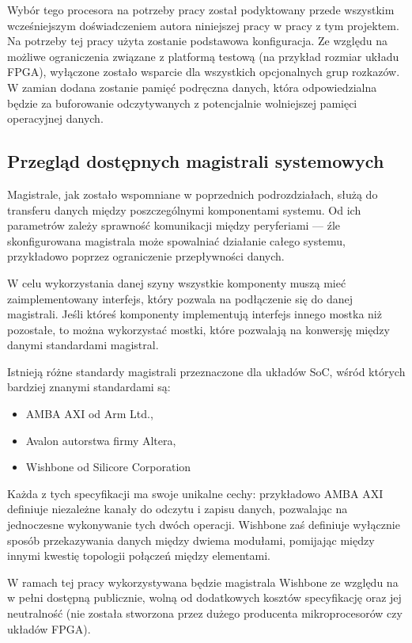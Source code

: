 Wybór tego procesora na potrzeby pracy został podyktowany przede wszystkim wcześniejszym doświadczeniem autora niniejszej pracy w pracy z tym projektem. Na potrzeby tej pracy użyta zostanie podstawowa konfiguracja. Ze względu na możliwe ograniczenia związane z platformą testową (na przykład rozmiar układu FPGA), wyłączone zostało wsparcie dla wszystkich opcjonalnych grup rozkazów. W zamian dodana zostanie pamięć podręczna danych, która odpowiedzialna będzie za buforowanie odczytywanych z potencjalnie wolniejszej pamięci operacyjnej danych.

\subsection{Przegląd dostępnych magistrali systemowych}

Magistrale, jak zostało wspomniane w poprzednich podrozdziałach, służą do transferu danych między poszczególnymi komponentami systemu. Od ich parametrów zależy sprawność komunikacji między peryferiami --- źle skonfigurowana magistrala może spowalniać działanie całego systemu, przykładowo poprzez ograniczenie przepływności danych.

W celu wykorzystania danej szyny wszystkie komponenty muszą mieć zaimplementowany interfejs, który pozwala na podłączenie się do danej magistrali. Jeśli któreś komponenty implementują interfejs innego mostka niż pozostałe, to można wykorzystać mostki, które pozwalają na konwersję między danymi standardami magistral.

Istnieją różne standardy magistrali przeznaczone dla układów SoC, wśród których bardziej znanymi standardami są:
\begin{itemize}
	\item AMBA AXI\cite{amba-axi:2021:Online} od Arm Ltd.,
	\item Avalon\cite{avalon:2005:Online} autorstwa firmy Altera,
	\item Wishbone\cite{wishbone:2019:Online} od Silicore Corporation
\end{itemize}

Każda z tych specyfikacji ma swoje unikalne cechy: przykładowo AMBA AXI definiuje niezależne kanały do odczytu i zapisu danych, pozwalając na jednoczesne wykonywanie tych dwóch operacji. Wishbone zaś definiuje wyłącznie sposób przekazywania danych między dwiema modułami, pomijając między innymi kwestię topologii połączeń między elementami.

W ramach tej pracy wykorzystywana będzie magistrala Wishbone ze względu na w pełni dostępną publicznie, wolną od dodatkowych kosztów specyfikację oraz jej neutralność (nie została stworzona przez dużego producenta mikroprocesorów czy układów FPGA).

